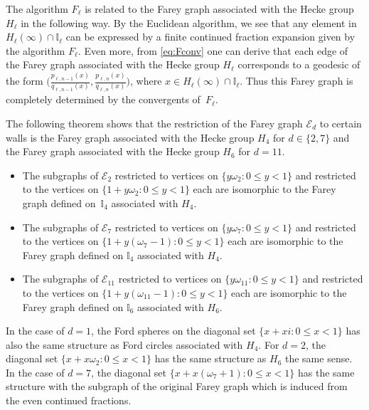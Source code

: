 \documentclass[graybox]{svmult}
\begin{document}
The algorithm $F_\ell$ is related to the Farey graph associated with the Hecke group $H_{\ell}$ in the following way.  By the Euclidean algorithm, we see that any element in $H_{\ell}(\infty) \cap \mathbb I_{\ell}$ can be expressed by a finite continued fraction expansion given by the algorithm $F_{\ell}$. Even more, from \eqref{eq:Fconv} one can derive that each edge of the Farey graph associated with the Hecke group $H_{\ell}$ corresponds to a geodesic of the form $\big( \frac{p_{\ell, n-1}(x)}{q_{\ell, n-1}(x)},  \frac{p_{\ell, n}(x)}{q_{\ell, n}(x)}\big)$, where $x\in H_{\ell}(\infty) \cap \mathbb I_{\ell}$. Thus this Farey graph is completely determined by the convergents of~$F_\ell$.

The following theorem shows that the restriction of the Farey graph $\mathcal{E}_d$ to certain walls is the Farey graph associated with the Hecke group $H_4$ for $d\in \{2,7\}$ and the Farey graph associated with the Hecke group $H_6$ for $d=11$.

\begin{theorem} 
\label{th:Hecke}
\mbox{}
\begin{itemize}
\item[(i)]\; The subgraphs of $\mathcal E_{2}$ restricted to vertices on $\{y\omega_{2} : 0 \le y <1\}$ and restricted to the vertices on $\{1+y\omega_{2} : 0 \le y <1\}$ each are isomorphic to the Farey graph defined on~$\mathbb I_{4}$ associated with $H_{4}$.  

\item[(ii)]\;The subgraphs of $\mathcal E_{7}$ restricted to vertices on $\{y\omega_{7} : 0 \le y <1\}$ and restricted to the vertices on $\{1+y(\omega_{7}-1) : 0 \le y <1\}$ each are isomorphic to the Farey graph defined on $\mathbb I_{4}$ associated with $H_{4}$.  

\item[(iii)]\; The subgraphs of $\mathcal E_{11}$ restricted to vertices on $\{y \omega_{11} : 0 \le y <1\}$ and restricted to the vertices on $\{1+y(\omega_{11}-1) : 0 \le y <1\}$ each are isomorphic to the  Farey graph defined on $\mathbb I_{6}$ associated with $H_{6}$.


\end{itemize}
\end{theorem}
\begin{remark}
In the case of $d=1$, the Ford spheres on the diagonal set $\{x+ xi : 0 \le x < 1\}$ 
has also the same structure as Ford circles associated with $ H_{4}$.  
For $d = 2$, the diagonal set $\{ x + x \omega_2 : 0 \le x < 1 \}$ has 
the same structure as $ H_{6}$ the same sense.  \\
In the case of $d = 7$, the diagonal set $\{ x + x(\omega_{7} + 1) 
: 0 \le x < 1 \}$ has the same structure with the subgraph of the original Farey graph which is induced from the even continued fractions.
\end{remark}    
\end{document}
